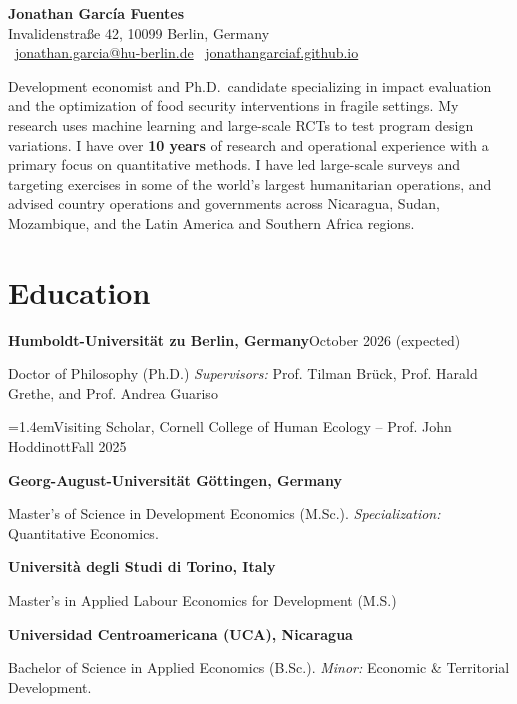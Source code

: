 \documentclass[10pt]{article}
\newcommand{\dt}[1]{\textcolor{cvgrey}{#1}}                    %
\newcommand{\eduline}[2]{\textbf{#1}\hfill\dt{#2}\par}         %
\newcommand{\indentdate}[2]{{\leftskip=1.4em\noindent\ignorespaces#1\hfill\dt{#2}\par}}
\newcommand{\gap}{\vspace{6.5pt}}
\begin{document}
\begin{center}
  {\LARGE\bfseries Jonathan García Fuentes}\\[0.35em]
  Invalidenstraße 42, 10099 Berlin, Germany\\[0.25em]
  \faEnvelope~\href{mailto:jonathan.garcia@hu-berlin.de}{\textcolor{cvlink}{jonathan.garcia@hu-berlin.de}}\qquad
  \faGithub~\href{https://jonathangarciaf.github.io}{\textcolor{cvlink}{jonathangarciaf.github.io}}
\end{center}

\vspace{4pt}
Development economist and Ph.D.\ candidate specializing in impact evaluation 
and the optimization of food security interventions in fragile settings.
My research uses machine learning and large-scale RCTs to test program design 
variations.
I have over \textbf{10 years} of research and operational experience with a primary 
focus on quantitative methods. I have led large-scale surveys and targeting 
exercises in some of the world's largest humanitarian operations, and advised 
country operations and governments across Nicaragua, Sudan, Mozambique, and 
the Latin America and Southern Africa regions.
\vspace{4pt}


\section{Education}
\eduline{Humboldt-Universität zu Berlin, Germany}{October 2026 (expected)}
Doctor of Philosophy (Ph.D.) \textit{Supervisors:} Prof. Tilman Brück, Prof. Harald Grethe, and Prof. Andrea Guariso\par
\indentdate{Visiting Scholar, Cornell College of Human Ecology -- Prof. John Hoddinott}{Fall 2025}
\gap
\eduline{Georg-August-Universität Göttingen, Germany}{}
Master's of Science in Development Economics (M.Sc.). \textit{Specialization:} Quantitative Economics.\par
\gap
\eduline{Università degli Studi di Torino, Italy}{}
Master's in Applied Labour Economics for Development (M.S.)\par
\gap
\eduline{Universidad Centroamericana (UCA), Nicaragua}{}
Bachelor of Science in Applied Economics (B.Sc.). \textit{Minor:} Economic \& Territorial Development.\par

\vspace{4pt}
\end{document}

